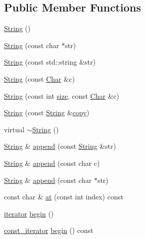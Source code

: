 \subsection*{Public Member Functions}
\begin{DoxyCompactItemize}
\item 
\hyperlink{classprism_1_1_string_a3a9df9dd5d297b91d2eec1ef7c4db8d3}{String} ()
\item 
\hyperlink{classprism_1_1_string_ad273f297c9125493c40876e368347fbf}{String} (const char $\ast$str)
\item 
\hyperlink{classprism_1_1_string_aedf9c8008bc992012ed8dea7b312683c}{String} (const std\+::string \&str)
\item 
\hyperlink{classprism_1_1_string_a15308d05157a15106dfa82ca9764ee30}{String} (const \hyperlink{classprism_1_1_char}{Char} \&c)
\item 
\hyperlink{classprism_1_1_string_adaf8ffdd5f77b21d8f11db6549fa7c17}{String} (const int \hyperlink{classprism_1_1_string_a603b5a90681d43adf7c6c29018e0300c}{size}, const \hyperlink{classprism_1_1_char}{Char} \&c)
\item 
\hyperlink{classprism_1_1_string_a6734cae1e3f2165a4a5d1f48cb56d0fe}{String} (const \hyperlink{classprism_1_1_string}{String} \&\hyperlink{namespaceprism_ae776f4cd825f79e7af1cf6ee1d90a209}{copy})
\item 
virtual \hyperlink{classprism_1_1_string_ab0114c8ba868b0facea3286d2764f010}{$\sim$\+String} ()
\item 
\hyperlink{classprism_1_1_string}{String} \& \hyperlink{classprism_1_1_string_af3c09c0f82ab5d85c78da4735f80fd6a}{append} (const \hyperlink{classprism_1_1_string}{String} \&str)
\item 
\hyperlink{classprism_1_1_string}{String} \& \hyperlink{classprism_1_1_string_abd1d707fe07b1e9565b77cf86b2fa5f5}{append} (const char c)
\item 
\hyperlink{classprism_1_1_string}{String} \& \hyperlink{classprism_1_1_string_a730e94334cafe06fb1e7f6c608bd1677}{append} (const char $\ast$str)
\item 
const char \& \hyperlink{classprism_1_1_string_a55e86af07823ab80c1b6b0849231312b}{at} (const int index) const 
\item 
\hyperlink{classprism_1_1_string_adacc7975837e5fff95d70690777fb330}{iterator} \hyperlink{classprism_1_1_string_ae8f176fbe590422a3061552b8ed36ec5}{begin} ()
\item 
\hyperlink{classprism_1_1_string_a8b46f0fbe9c5c94ba892975242e3ab68}{const\+\_\+iterator} \hyperlink{classprism_1_1_string_ab3b18cfb5a3de6481f2f3d82bf5f0ef6}{begin} () const 

\end{DoxyCompactItemize}
